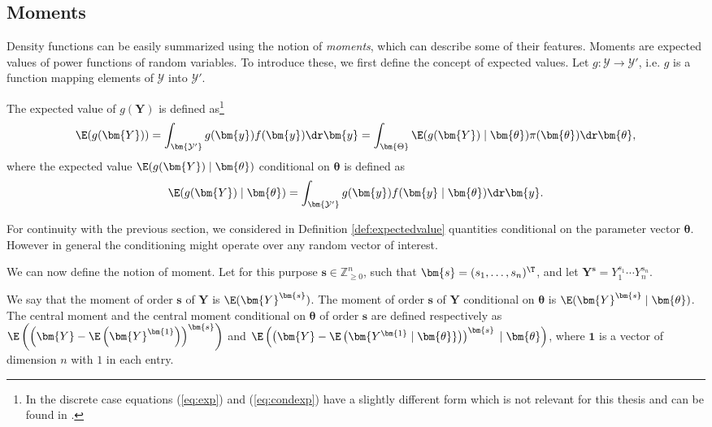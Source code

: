 \subsection{Moments}
Density functions can be easily summarized using the notion of \textit{moments}, which can describe some of their features. Moments are expected values of power functions of random variables. To introduce these, we first define the concept of expected  values. Let $g:\bm{\mathcal{Y}}\rightarrow \bm{\mathcal{Y}'}$, i.e. $g$ is a function mapping elements of $\bm{\mathcal{Y}}$ into $\bm{\mathcal{Y}'}$. 

\begin{definition}
\label{def:expectedvalue}
The expected value of $g(\bm{Y})$ is defined as\footnote{In the discrete case equations (\ref{eq:exp}) and (\ref{eq:condexp}) have a slightly different form which is not relevant for this thesis and can be found in \citet{Casella2002}.}
\begin{equation}
\label{eq:exp}
\E(g(\bm{Y}))=\int_{\bm{\mathcal{Y}'}}g(\bm{y})f(\bm{y})\dr \bm{y}=\int_{\bm{\Theta}}\E(g(\bm{Y})\;|\;\bm{\theta})\pi(\bm{\theta})\dr \bm{\theta},
\end{equation}
where the expected value $\E(g(\bm{Y})\;|\;\bm{\theta})$ conditional  on $\bm{\theta}$ is defined as
\begin{equation}
\label{eq:condexp}
\E(g(\bm{Y})\;|\;\bm{\theta})=\int_{\bm{\mathcal{Y}'}}g(\bm{y})f(\bm{y}\;|\;\bm{\theta})\dr\bm{y}.
\end{equation}
\end{definition}
For continuity with the previous section, we considered in Definition \ref{def:expectedvalue} quantities conditional on the parameter vector $\bm{\theta}$. However in general the conditioning might operate over any random vector of interest.

We can now define the notion of moment. Let for this purpose $\bm{s}\in \mathbb{Z}_{\geq 0}^n$, such that $\bm{s}=(s_1,\dots,s_n)^\T$, and let $\bm{Y}^{\bm{s}}=Y_1^{s_1}\cdots Y_n^{s_n}$. 

\begin{definition}
We say that the moment of order $\bm{s}$ of $\bm{Y}$ is $\E(\bm{Y}^{\bm{s}})$. The moment of order $\bm{s}$ of $\bm{Y}$ conditional on $\bm{\theta}$ is $\E(\bm{Y}^{\bm{s}}\;|\;\bm{\theta})$. The central moment and the central moment conditional on $\bm{\theta}$ of order $\bm{s}$ are defined respectively as $\E\left(\left(\bm{Y}-\E\left(\bm{Y}^{\bm{1}}\right)\right)^{\bm{s}}\right)$ and $\E\left(\left(\bm{Y}-\E\left(\bm{Y^{\bm{1}}\;|\;\bm{\theta}}\right)\right)^{\bm{s}}\;|\;\bm{\theta}\right)$, where $\bm{1}$ is a vector of dimension $n$ with $1$ in each entry.
\end{definition}

